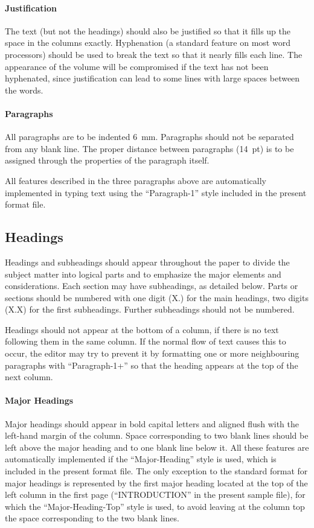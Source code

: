 \documentclass[bibtex,pagenumbers]{stabs2021}
\begin{document}
\paragraph{Justification}

The text (but not the headings) should also be justified so that it
fills up the space in the columns exactly. Hyphenation (a standard
feature on most word processors) should be used to break the text so
that it nearly fills each line. The appearance of the volume will be
compromised if the text has not been hyphenated, since justification
can lead to some lines with large spaces between the words.

\paragraph{Paragraphs}

All paragraphs are to be indented 6~mm. Paragraphs should not be
separated from any blank line. The proper distance between paragraphs
(14~pt) is to be assigned through the properties of the paragraph
itself.

All features described in the three paragraphs above are automatically
implemented in typing text using the ``Paragraph-1'' style included in
the present format file.

\subsection{Headings}

Headings and subheadings should appear throughout the paper to divide
the subject matter into logical parts and to emphasize the major
elements and considerations. Each section may have subheadings, as
detailed below. Parts or sections should be numbered with one digit
(X.) for the main headings, two digits (X.X) for the first
subheadings. Further subheadings should not be numbered.

Headings should not appear at the bottom of a column, if there is no
text following them in the same column. If the normal flow of text
causes this to occur, the editor may try to prevent it by formatting
one or more neighbouring paragraphs with ``Paragraph-1+'' so that the
heading appears at the top of the next column.

\paragraph{Major Headings}

Major headings should appear in bold capital letters and aligned flush
with the left-hand margin of the column. Space corresponding to two
blank lines should be left above the major heading and to one blank
line below it. All these features are automatically implemented if the
``Major-Heading'' style is used, which is included in the present
format file. The only exception to the standard format for major
headings is represented by the first major heading located at the top
of the left column in the first page (``INTRODUCTION'' in the present
sample file), for which the ``Major-Heading-Top'' style is used, to
avoid leaving at the column top the space corresponding to the two
blank lines.
\end{document}
